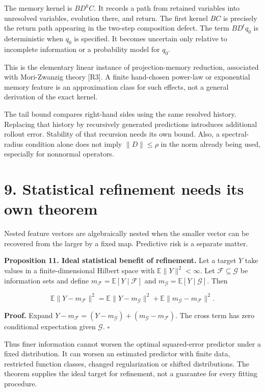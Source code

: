 \documentclass[11pt,letterpaper]{article}
\begin{document}
The memory kernel is \(BD^kC\). It records a path from retained
variables into unresolved variables, evolution there, and return. The
first kernel \(BC\) is precisely the return path appearing in the
two-step composition defect. The term \(BD^tq_0\) is deterministic when
\(q_0\) is specified. It becomes uncertain only relative to incomplete
information or a probability model for \(q_0\).

This is the elementary linear instance of projection-memory reduction,
associated with Mori-Zwanzig theory {[}R3{]}. A finite hand-chosen
power-law or exponential memory feature is an approximation class for
such effects, not a general derivation of the exact kernel.

The tail bound compares right-hand sides using the same resolved
history. Replacing that history by recursively generated predictions
introduces additional rollout error. Stability of that recursion needs
its own bound. Also, a spectral-radius condition alone does not imply
\(\|D\|\leq\rho\) in the norm already being used, especially for
nonnormal operators.

\section{9. Statistical refinement needs its own
theorem}\label{statistical-refinement-needs-its-own-theorem}

Nested feature vectors are algebraically nested when the smaller vector
can be recovered from the larger by a fixed map. Predictive risk is a
separate matter.

\textbf{Proposition 11. Ideal statistical benefit of refinement.} Let a
target \(Y\) take values in a finite-dimensional Hilbert space with
\(\mathbb E\|Y\|^2<\infty\). Let \(\mathcal F\subseteq\mathcal G\) be
information sets and define
\(m_{\mathcal F}=\mathbb E[Y\mid\mathcal F]\) and
\(m_{\mathcal G}=\mathbb E[Y\mid\mathcal G]\). Then

\[
\mathbb E\|Y-m_{\mathcal F}\|^2
=
\mathbb E\|Y-m_{\mathcal G}\|^2
+\mathbb E\|m_{\mathcal G}-m_{\mathcal F}\|^2.
\]

\textbf{Proof.} Expand
\(Y-m_{\mathcal F}=(Y-m_{\mathcal G})+(m_{\mathcal G}-m_{\mathcal F})\).
The cross term has zero conditional expectation given \(\mathcal G\).
\(\square\)

Thus finer information cannot worsen the optimal squared-error predictor
under a fixed distribution. It can worsen an estimated predictor with
finite data, restricted function classes, changed regularization or
shifted distributions. The theorem supplies the ideal target for
refinement, not a guarantee for every fitting procedure.
\end{document}
